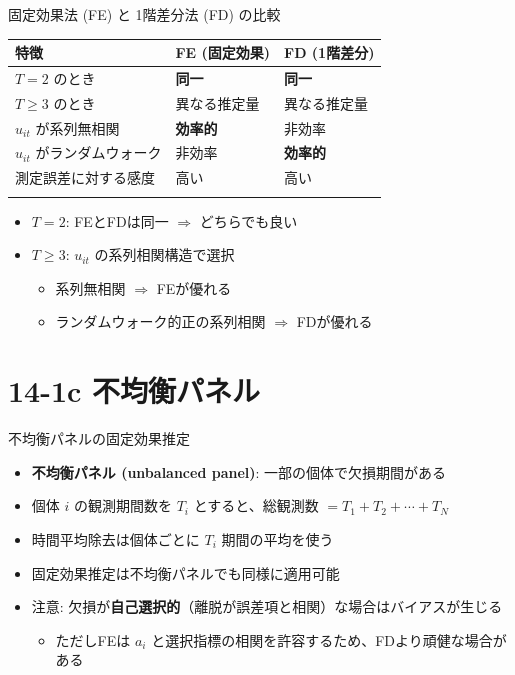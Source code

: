 \documentclass[
  ignorenonframetext,
]{beamer}
\providecommand{\tightlist}{%
  \setlength{\itemsep}{0pt}\setlength{\parskip}{0pt}}
\begin{document}
\begin{frame}{固定効果法 (FE) と 1階差分法 (FD) の比較}
\label{ux56faux5b9aux52b9ux679cux6cd5-fe-ux3068-1ux968eux5deeux5206ux6cd5-fd-ux306eux6bd4ux8f03}
\begin{longtable}[]{@{}lll@{}}
\toprule\noalign{}
特徴 & FE (固定効果) & FD (1階差分) \\
\midrule\noalign{}
\endhead
\(T=2\) のとき & \textbf{同一} & \textbf{同一} \\
\(T \geq 3\) のとき & 異なる推定量 & 異なる推定量 \\
\(u_{it}\) が系列無相関 & \textbf{効率的} & 非効率 \\
\(u_{it}\) がランダムウォーク & 非効率 & \textbf{効率的} \\
測定誤差に対する感度 & 高い & 高い \\
\bottomrule\noalign{}
\end{longtable}

\begin{itemize}
\tightlist
\item
  \(T = 2\): FEとFDは同一 \(\Rightarrow\) どちらでも良い
\item
  \(T \geq 3\): \(u_{it}\) の系列相関構造で選択

  \begin{itemize}
  \tightlist
  \item
    系列無相関 \(\Rightarrow\) FEが優れる
  \item
    ランダムウォーク的正の系列相関 \(\Rightarrow\) FDが優れる
  \end{itemize}
\end{itemize}
\end{frame}

\section{14-1c
不均衡パネル}\label{c-ux4e0dux5747ux8861ux30d1ux30cdux30eb}

\begin{frame}{不均衡パネルの固定効果推定}
\label{ux4e0dux5747ux8861ux30d1ux30cdux30ebux306eux56faux5b9aux52b9ux679cux63a8ux5b9a}
\begin{itemize}
\tightlist
\item
  \textbf{不均衡パネル (unbalanced panel)}: 一部の個体で欠損期間がある
\item
  個体 \(i\) の観測期間数を \(T_i\) とすると、総観測数
  \(= T_1 + T_2 + \cdots + T_N\)
\item
  時間平均除去は個体ごとに \(T_i\) 期間の平均を使う
\item
  固定効果推定は不均衡パネルでも同様に適用可能
\item
  注意:
  欠損が\textbf{自己選択的}（離脱が誤差項と相関）な場合はバイアスが生じる

  \begin{itemize}
  \tightlist
  \item
    ただしFEは \(a_i\)
    と選択指標の相関を許容するため、FDより頑健な場合がある
  \end{itemize}
\end{itemize}
\end{frame}
\end{document}
